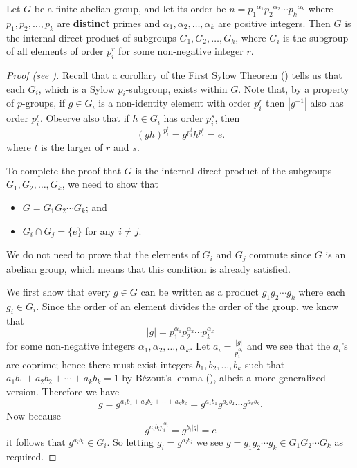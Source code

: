 \begin{lemma}\label{lemma-fundamental-theorem-of-finite-abelian-groups-1}
    Let $G$ be a finite abelian group, and let its order be $n = {p_1}^{\alpha_1}{p_2}^{\alpha_2}\cdots{p_k}^{\alpha_k}$ where $p_1, p_2, \dots, p_k$ are \textbf{distinct} primes and $\alpha_1, \alpha_2, \dots, \alpha_k$ are positive integers. Then $G$ is the internal direct product of subgroups $G_1, G_2, \dots, G_k$, where $G_i$ is the subgroup of all elements of order $p_i^r$ for some non-negative integer $r$.
\end{lemma}
\begin{proof}[Proof (see {\cite[Lemma 13.8]{judson_beezer_2022}})]
    Recall that a corollary of the First Sylow Theorem () tells us that each $G_i$, which is a Sylow $p_i$-subgroup, exists within $G$. Note that, by a property of $p$-groups, if $g \in G_i$ is a non-identity element with order $p_i^r$ then $|g^{-1}|$ also has order $p_i^r$. Observe also that if $h \in G_i$ has order $p_i^s$, then
    \[
        (gh)^{p_i^t} = g^{p_i^t}h^{p_i^t} = e.
    \]
    where $t$ is the larger of $r$ and $s$.

    To complete the proof that $G$ is the internal direct product of the subgroups $G_1, G_2, \dots, G_k$, we need to show that
    \begin{itemize}
        \item $G = G_1G_2\cdots G_k$; and
        \item $G_i \cap G_j = \{e\}$ for any $i \neq j$.
    \end{itemize}
    We do not need to prove that the elements of $G_i$ and $G_j$ commute since $G$ is an abelian group, which means that this condition is already satisfied.

    We first show that every $g \in G$ can be written as a product $g_1g_2\cdots g_k$ where each $g_i \in G_i$. Since the order of an element divides the order of the group, we know that
    \[
        |g| = p_1^{\alpha_1}p_2^{\alpha_2}\cdots p_k^{\alpha_k}
    \]
    for some non-negative integers $\alpha_1, \alpha_2, \dots, \alpha_k$. Let $a_i = \frac{|g|}{p_i^{\alpha_i}}$ and we see that the $a_i$'s are coprime; hence there must exist integers $b_1, b_2, \dots, b_k$ such that $a_1b_1 + a_2b_2 + \cdots + a_kb_k = 1$ by B\'ezout's lemma (), albeit a more generalized version. Therefore we have
    \[
        g = g^{a_1b_1 + a_2b_2 + \cdots + a_kb_k} = g^{a_1b_1}g^{a_2b_2}\cdots g^{a_kb_k}.
    \]
    Now because
    \[
        g^{a_ib_ip_i^{\alpha_i}} = g^{b_i|g|} = e
    \]
    it follows that $g^{a_ib_i} \in G_i$. So letting $g_i = g^{a_ib_i}$ we see $g = g_1g_2\cdots g_k \in G_1G_2\cdots G_k$ as required.


\end{proof}
